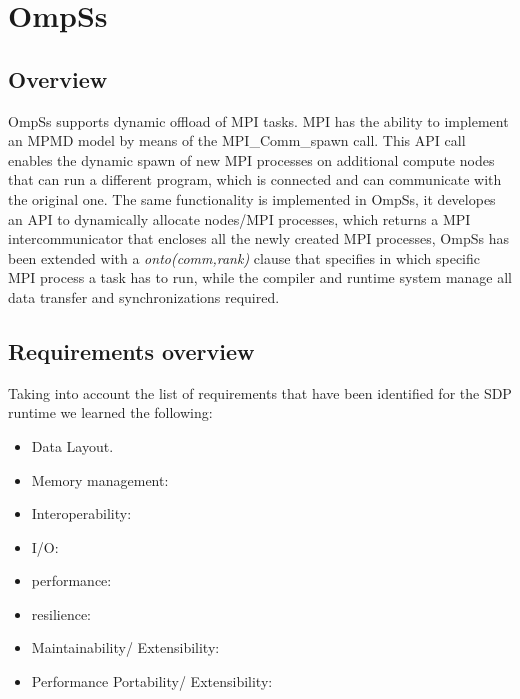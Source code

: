 \section{OmpSs}

\subsection{Overview}

OmpSs supports dynamic offload of MPI tasks. MPI has the ability to implement an MPMD model by means of the MPI\_Comm\_spawn call. This API call enables
the dynamic spawn of new MPI processes on additional compute nodes that can run a different program, which is connected and can communicate with the original one.
The same functionality is implemented in OmpSs, it developes an API to dynamically allocate nodes/MPI processes, which returns a MPI intercommunicator that encloses
all the newly created MPI processes, OmpSs has been extended with a \emph{onto(comm,rank)} clause that specifies in which specific MPI process a task has to run, while
the compiler and runtime system manage all data transfer and synchronizations required.


\subsection{Requirements overview}

Taking into account the list of requirements that have been identified for the SDP runtime we learned the following: 
\begin{itemize}
\item Data Layout. 
\item Memory management: 
\item Interoperability: 
\item I/O: 
\item performance: 
\item resilience: 
\item Maintainability/ Extensibility: 
\item Performance Portability/ Extensibility: 
\end{itemize}


